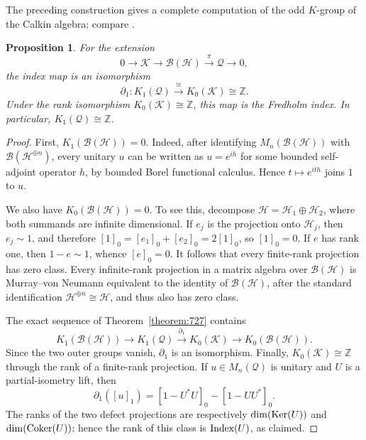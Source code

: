 \documentclass{book}
\newtheorem{proposition}[definition]{Proposition}
\def\Index{\textnormal{Index}}
\begin{document}
The preceding construction gives a complete computation of the odd \(K\)-group of the
Calkin algebra; compare \cite[Example~9.4.3]{RordamLarsenLaustsen2000}.
\begin{proposition}\label{prop:K1Calkin}
  For the extension
  \[
    0\longrightarrow\mathcal{K}\longrightarrow\mathcal{B}(\mathcal{H})
      \overset{\pi}{\longrightarrow}\mathcal{Q}\longrightarrow 0,
  \]
  the index map is an isomorphism
  \[
    \partial_1:K_1(\mathcal{Q})\overset{\cong}{\longrightarrow}
      K_0(\mathcal{K})\cong\mathbb{Z}.
  \]
  Under the rank isomorphism \(K_0(\mathcal{K})\cong\mathbb{Z}\), this map is the
  Fredholm index. In particular, \(K_1(\mathcal{Q})\cong\mathbb{Z}\).
\end{proposition}
\begin{proof}
  First, \(K_1(\mathcal{B}(\mathcal{H}))=0\). Indeed, after identifying
  \(M_n(\mathcal{B}(\mathcal{H}))\) with \(\mathcal{B}(\mathcal{H}^{\oplus n})\), every
  unitary \(u\) can be written as \(u=e^{ih}\) for some bounded self-adjoint operator
  \(h\), by bounded Borel functional calculus. Hence \(t\mapsto e^{ith}\) joins \(1\)
  to \(u\).

  We also have \(K_0(\mathcal{B}(\mathcal{H}))=0\). To see this, decompose
  \(\mathcal{H}=\mathcal{H}_1\oplus\mathcal{H}_2\), where both summands are infinite
  dimensional. If \(e_j\) is the projection onto \(\mathcal{H}_j\), then
  \(e_j\sim 1\), and therefore
  \([1]_0=[e_1]_0+[e_2]_0=2[1]_0\), so \([1]_0=0\). If \(e\) has rank one, then
  \(1-e\sim 1\), whence \([e]_0=0\). It follows that every finite-rank projection has
  zero class. Every infinite-rank projection in a matrix algebra over
  \(\mathcal{B}(\mathcal{H})\) is Murray--von Neumann equivalent to the identity of
  \(\mathcal{B}(\mathcal{H})\), after the standard identification
  \(\mathcal{H}^{\oplus n}\cong\mathcal{H}\), and thus also has zero class.

  The exact sequence of Theorem~\ref{theorem:727} contains
  \[
    K_1(\mathcal{B}(\mathcal{H}))\longrightarrow K_1(\mathcal{Q})
      \overset{\partial_1}{\longrightarrow}K_0(\mathcal{K})
      \longrightarrow K_0(\mathcal{B}(\mathcal{H})).
  \]
  Since the two outer groups vanish, \(\partial_1\) is an isomorphism. Finally,
  \(K_0(\mathcal{K})\cong\mathbb{Z}\) through the rank of a finite-rank projection.
  If \(u\in M_n(\mathcal{Q})\) is unitary and \(U\) is a partial-isometry lift, then
  \[
    \partial_1({[u]}_1)
      ={[1-U^*U]}_0-{[1-UU^*]}_0.
  \]
  The ranks of the two defect projections are respectively
  \(\dim(\textnormal{Ker}(U))\) and \(\dim(\textnormal{Coker}(U))\); hence the rank of this class is
  \(\Index(U)\), as claimed.
\end{proof}
\end{document}
